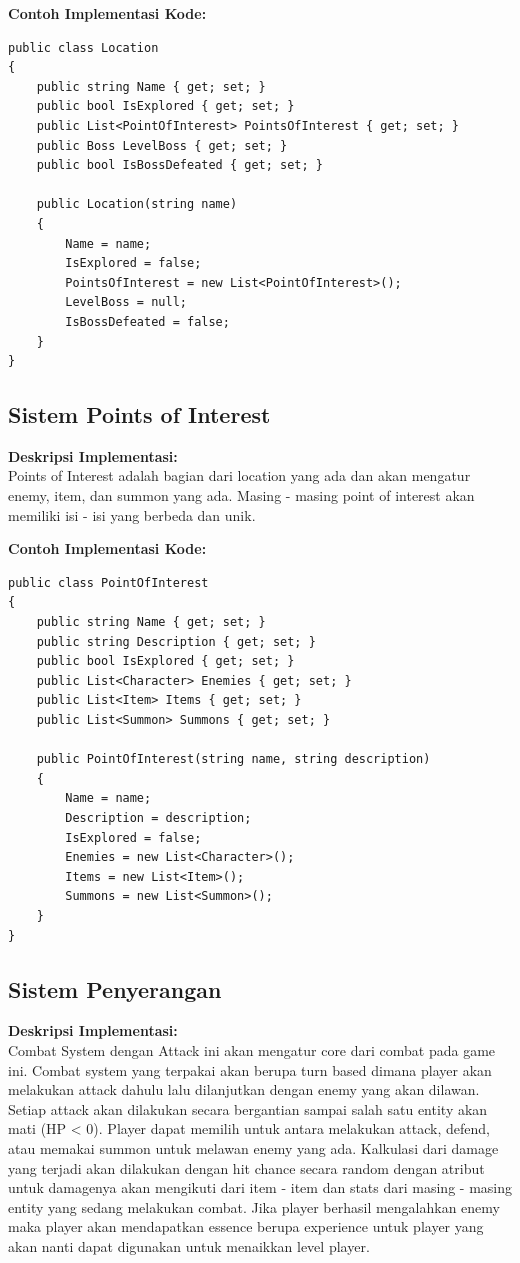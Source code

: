 \documentclass[12pt]{article}
\begin{document}
\textbf{Contoh Implementasi Kode:}
\begin{lstlisting}[language=CSharp, caption=Implementasi Sistem Lokasi]
public class Location
{
    public string Name { get; set; }
    public bool IsExplored { get; set; }
    public List<PointOfInterest> PointsOfInterest { get; set; }
    public Boss LevelBoss { get; set; }
    public bool IsBossDefeated { get; set; }

    public Location(string name)
    {
        Name = name;
        IsExplored = false;
        PointsOfInterest = new List<PointOfInterest>();
        LevelBoss = null;
        IsBossDefeated = false;
    }
}
\end{lstlisting}

\subsection{Sistem Points of Interest}
\textbf{Deskripsi Implementasi:} \\
Points of Interest adalah bagian dari location yang ada dan akan mengatur enemy, item, dan summon yang ada. Masing - masing point of interest akan memiliki isi - isi yang berbeda dan unik. 

\textbf{Contoh Implementasi Kode:}
\begin{lstlisting}[language=CSharp, caption=Implementasi Points of Interest]
public class PointOfInterest
{
    public string Name { get; set; }
    public string Description { get; set; }
    public bool IsExplored { get; set; }
    public List<Character> Enemies { get; set; }
    public List<Item> Items { get; set; }
    public List<Summon> Summons { get; set; }

    public PointOfInterest(string name, string description)
    {
        Name = name;
        Description = description;
        IsExplored = false;
        Enemies = new List<Character>();
        Items = new List<Item>();
        Summons = new List<Summon>();
    }
}
\end{lstlisting}

\subsection{Sistem Penyerangan}
\textbf{Deskripsi Implementasi:} \\
Combat System dengan Attack ini akan mengatur core dari combat pada game ini. Combat system yang terpakai akan berupa turn based dimana player akan melakukan attack dahulu lalu dilanjutkan dengan enemy yang akan dilawan. Setiap attack akan dilakukan secara bergantian sampai salah satu entity akan mati (HP < 0). Player dapat memilih untuk antara melakukan attack, defend, atau memakai summon untuk melawan enemy yang ada. Kalkulasi dari damage yang terjadi akan dilakukan dengan hit chance secara random dengan atribut untuk damagenya akan mengikuti dari item - item dan stats dari masing - masing entity yang sedang melakukan combat. Jika player berhasil mengalahkan enemy maka player akan mendapatkan essence berupa experience untuk player yang akan nanti dapat digunakan untuk menaikkan level player.
\end{document}
